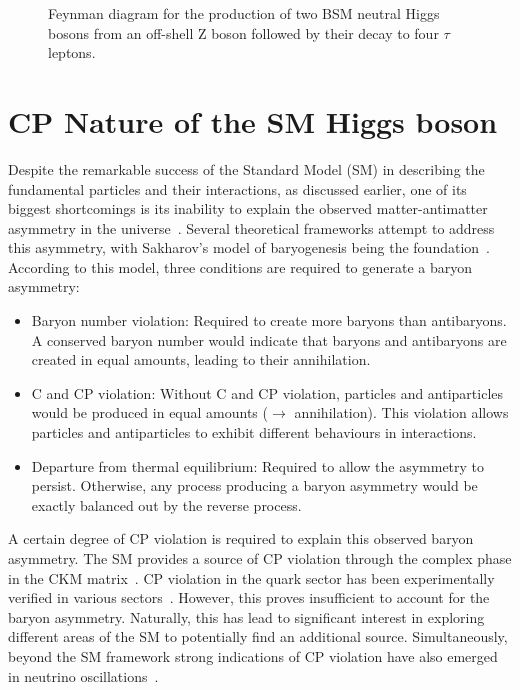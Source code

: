 \begin{figure}[h]
\centering

\caption{Feynman diagram for the production of two BSM neutral Higgs bosons from an off-shell Z boson followed by their decay to four $\tau$ leptons.}
\label{Figure:Chapter2_Feynman4tau}
\end{figure}

\section{CP Nature of the SM Higgs boson}

Despite the remarkable success of the Standard Model (SM) in describing the fundamental particles and their interactions, as discussed earlier, one of its biggest shortcomings is its inability to explain the observed matter-antimatter asymmetry in the universe~\cite{MatterAntimatter}. Several theoretical frameworks attempt to address this asymmetry, with Sakharov's model of baryogenesis being the foundation~\cite{Sakharov}. According to this model, three conditions are required to generate a baryon asymmetry:

\begin{itemize}
    \item Baryon number violation: Required to create more baryons than antibaryons. A conserved baryon number would indicate that baryons and antibaryons are created in equal amounts, leading to their annihilation.
    \item C and CP violation: Without C and CP violation, particles and antiparticles would be produced in equal amounts ($\rightarrow$ annihilation). This violation allows particles and antiparticles to exhibit different behaviours in interactions.
    \item Departure from thermal equilibrium: Required to allow the asymmetry to persist. Otherwise, any process producing a baryon asymmetry would be exactly balanced out by the reverse process.
\end{itemize}

A certain degree of CP violation is required to explain this observed baryon asymmetry. The SM provides a source of CP violation through the complex phase in the CKM matrix~\cite{CKM_1,CKM_2}. CP violation in the quark sector has been experimentally verified in various sectors~\cite{CP_QuarkSector_1, CP_QuarkSector_2, CP_QuarkSector_3, CP_QuarkSector_4, 
CP_QuarkSector_5, CP_QuarkSector_6, CP_QuarkSector_7, CP_QuarkSector_8, 
CP_QuarkSector_9, CP_QuarkSector_10, CP_QuarkSector_11, CP_QuarkSector_12, 
CP_QuarkSector_13, CP_QuarkSector_14}. However, this proves insufficient to account for the baryon asymmetry. 
Naturally, this has lead to significant interest in exploring different areas of the SM to potentially find an additional source. Simultaneously, beyond the SM framework strong indications of CP violation have also emerged in neutrino oscillations~\cite{CP_Neutrino_Oscillations}. 

